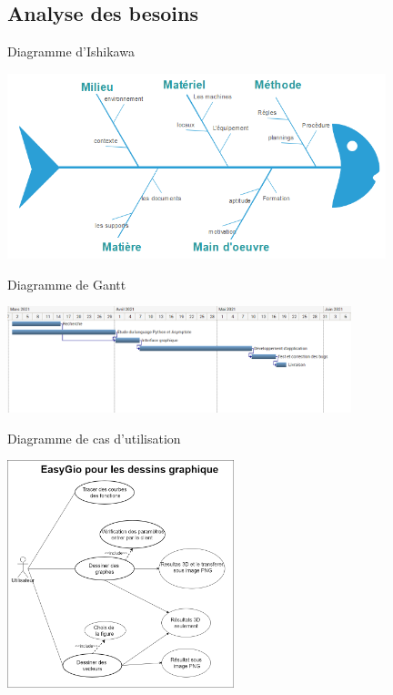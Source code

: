 \documentclass{beamer}
\begin{document}
\subsection{Analyse des besoins}
\begin{frame}{Diagramme d'Ishikawa}
\begin{center}
    \includegraphics[width=11cm]{pic/Ishikawa.PNG}
\end{center}
\end{frame}
\begin{frame}{Diagramme de Gantt}
\begin{center}
     \includegraphics[width=10cm]{pic/Gantt.PNG}   
\end{center}
\end{frame}
\begin{frame}{Diagramme de cas d'utilisation}
\begin{center}
    \includegraphics[width=6.6cm]{pic/MY UML.png}
\end{center}
\end{frame}
\end{document}
